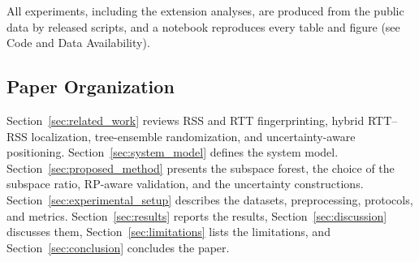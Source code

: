 All experiments, including the extension analyses, are produced from the public data by released scripts, and a notebook reproduces every table and figure (see Code and Data Availability).


\subsection{Paper Organization}

Section~\ref{sec:related_work} reviews RSS and RTT fingerprinting, hybrid RTT--RSS localization, tree-ensemble randomization, and uncertainty-aware positioning. Section~\ref{sec:system_model} defines the system model. Section~\ref{sec:proposed_method} presents the subspace forest, the choice of the subspace ratio, RP-aware validation, and the uncertainty constructions. Section~\ref{sec:experimental_setup} describes the datasets, preprocessing, protocols, and metrics. Section~\ref{sec:results} reports the results, Section~\ref{sec:discussion} discusses them, Section~\ref{sec:limitations} lists the limitations, and Section~\ref{sec:conclusion} concludes the paper.
